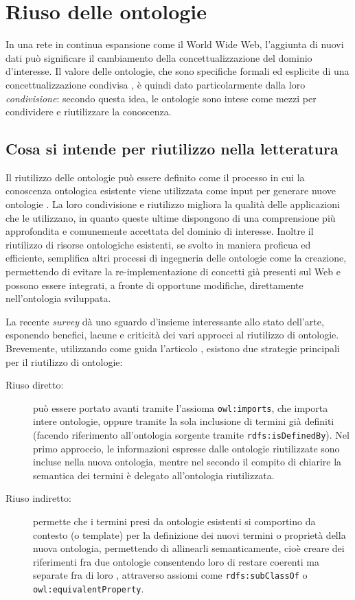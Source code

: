 \section{Riuso delle ontologie}
\label{sec:OntoReuse}
In una rete in continua espansione come il World Wide Web, l'aggiunta di nuovi dati può significare il cambiamento della concettualizzazione del dominio d'interesse. Il valore delle ontologie, che sono specifiche formali ed esplicite di una concettualizzazione condivisa \cite{goy2015ontologies}, è quindi dato particolarmente dalla loro \textit{condivisione}: secondo questa idea, le ontologie sono intese come mezzi per condividere e riutilizzare la conoscenza.
\subsection{Cosa si intende per riutilizzo nella letteratura}
Il riutilizzo delle ontologie può essere definito come il processo in cui la conoscenza ontologica esistente viene utilizzata come input per generare nuove ontologie \cite{feasibilityStudy}. La loro condivisione e riutilizzo migliora la qualità delle applicazioni che le utilizzano, in quanto queste ultime dispongono di una comprensione più approfondita e comunemente accettata del dominio di interesse. Inoltre il riutilizzo di risorse ontologiche esistenti, se svolto in maniera proficua ed efficiente, semplifica altri processi di ingegneria delle ontologie come la creazione, permettendo di evitare la re-implementazione di concetti già presenti sul Web e possono essere integrati, a fronte di opportune modifiche, direttamente nell'ontologia sviluppata.

La recente \textit{survey} \cite{carriero2020OntoReuse} dà uno sguardo d'insieme interessante allo stato dell'arte, esponendo benefici, lacune e criticità dei vari approcci al riutilizzo di ontologie. Brevemente, utilizzando come guida l'articolo \cite{carriero2020OntoReuse}, esistono due strategie principali per il riutilizzo di ontologie:
\begin{description}
	\item[Riuso diretto:] può essere portato avanti tramite l'assioma \texttt{owl:imports}, che importa intere ontologie, oppure tramite la sola inclusione di termini già definiti (facendo riferimento all'ontologia sorgente tramite \texttt{rdfs:isDefinedBy}). Nel primo approccio, le informazioni espresse dalle ontologie riutilizzate sono incluse nella nuova ontologia, mentre nel secondo il compito di chiarire la semantica dei termini è delegato all'ontologia riutilizzata.
	\item[Riuso indiretto:] permette che i termini presi da ontologie esistenti si comportino da contesto (o template) per la definizione dei nuovi termini o proprietà della nuova ontologia, permettendo di allinearli semanticamente, cioè creare dei riferimenti fra due ontologie consentendo loro di restare coerenti ma separate fra di loro \cite{choi2006Mapping}, attraverso assiomi come \texttt{rdfs:subClassOf} o \texttt{owl:equivalentProperty}.
\end{description}

